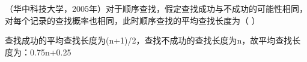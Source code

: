 \question （华中科技大学，2005年）对于顺序查找，假定查找成功与不成功的可能性相同，对每个记录的查找概率也相同，此时顺序查找的平均查找长度为（
）
\par{}
\begin{solution}查找成功的平均查找长度为(n+1)/2，查找不成功的查找长度为n，故平均查找长度为：0.75n+0.25
\end{solution}
